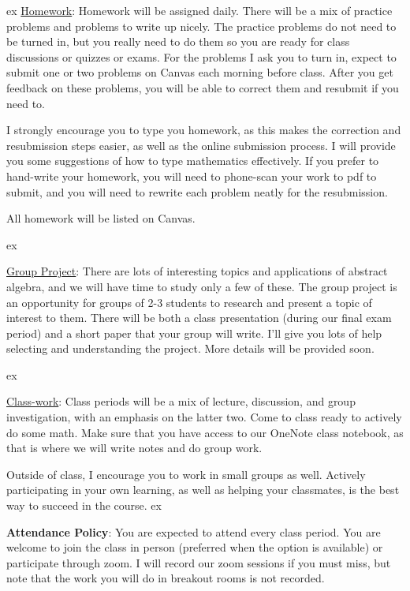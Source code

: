 \documentclass[12pt,letterpaper]{article}
\begin{document}
 ex
\underline{Homework}: Homework will be assigned daily.  There will be a mix of practice problems and problems to write up nicely.  
The practice problems do not need to be turned in, but you really need to do them so you are ready for class discussions or quizzes or exams.  For the problems I ask you to turn in, expect to submit one or two problems on Canvas each morning before class.  After you get feedback on these problems, you will be able to correct them and resubmit if you need to.

I strongly encourage you to type you homework, as this makes the correction and resubmission steps easier, as well as the online submission process.  I will provide you some suggestions of how to type mathematics effectively.  If you prefer to hand-write your homework, you will need to phone-scan your work to pdf to submit, and you will need to rewrite each problem neatly for the resubmission.

All homework will be listed on Canvas.

 ex

\underline{Group Project}: There are lots of interesting topics and applications of abstract algebra, and we will have time to study only a few of these.  The group project is an opportunity for groups of 2-3 students to research and present a topic of interest to them.  There will be both a class presentation (during our final exam period) and a short paper that your group will write.  I'll give you lots of help selecting and understanding the project.  More details will be provided soon.

 ex

\underline{Class-work}:  Class periods will be a mix of lecture, discussion, and group investigation, with an emphasis on the latter two.  Come to class ready to actively do some math.  Make sure that you have access to our OneNote class notebook, as that is where we will write notes and do group work.  

Outside of class, I encourage you to work in small groups as well.  Actively participating in your own learning, as well as helping your classmates, is the best way to succeed in the course.
 ex

\noindent
\textbf{Attendance Policy}: You are expected to attend every class period.  You are welcome to join the class in person (preferred when the option is available) or participate through zoom.  I will record our zoom sessions if you must miss, but note that the work you will do in breakout rooms is not recorded.  
\end{document}
